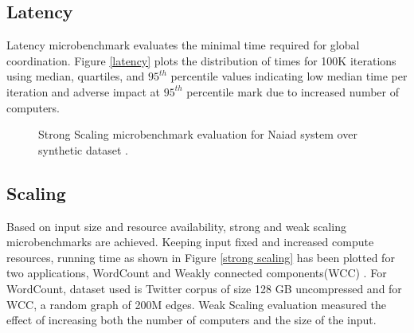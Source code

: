 \documentclass[9pt,twocolumn,twoside]{../../styles/osajnl}
\begin{document}
\subsection{Latency}
Latency microbenchmark evaluates the minimal time required for global
coordination. Figure \ref{latency} plots the distribution of times for
100K iterations using median, quartiles, and $95^{th}$ percentile
values indicating low median time per iteration and adverse impact at
$95^{th}$ percentile mark due to increased number of computers.


\begin{figure}[htbp]
\centering
{}
\caption{ Strong Scaling microbenchmark evaluation for Naiad system
  over synthetic dataset \cite{paper1-Naiad}.}
\label{strong scaling}
\end{figure}

\subsection{Scaling}
Based on input size and resource availability, strong and weak scaling
microbenchmarks are achieved. Keeping input fixed and increased
compute resources, running time as shown in Figure \ref{strong
  scaling} has been plotted for two applications, WordCount and Weakly
connected components(WCC) . For WordCount, dataset used is Twitter
corpus of size 128 GB uncompressed and for WCC, a random graph of 200M
edges. Weak Scaling evaluation measured the effect of increasing both
the number of computers and the size of the input.
\end{document}
